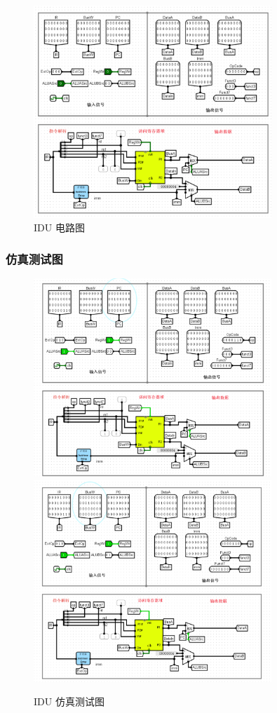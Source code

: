\documentclass{article}
\begin{document}
    \begin{figure}[H]
    \centering
    \includegraphics[width=0.8\textwidth]{6.4.2.png}
    \caption{IDU 电路图}
    \end{figure}

    \subsubsection{仿真测试图}
    \begin{figure}[H]
    \centering
    \includegraphics[width=0.8\textwidth]{6.5.1.png}
    \includegraphics[width=0.8\textwidth]{6.5.2.png}
    \caption{IDU 仿真测试图}
    \end{figure}
\end{document}

